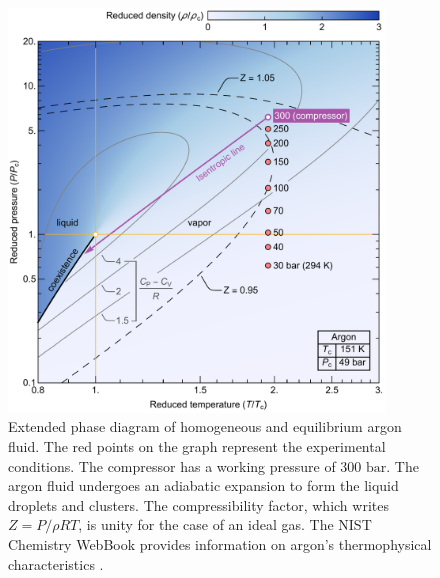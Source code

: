 \begin{figure}[t!]
\centering
\includegraphics[width=100mm]{figures/ch2/phaseDiag/phaseDiag.pdf}
\caption{Extended phase diagram of homogeneous and equilibrium argon fluid. The red points on the graph represent the experimental conditions. The compressor has a working pressure of $300 \text{ bar}$. The argon fluid undergoes an adiabatic expansion to form the liquid droplets and clusters. The compressibility factor, which writes $Z=P/ρRT$, is unity for the case of an ideal gas. The NIST Chemistry WebBook provides information on argon's thermophysical characteristics \cite{linstorm2020nist}.}
\label{fig:phaseDiag}
\end{figure}

